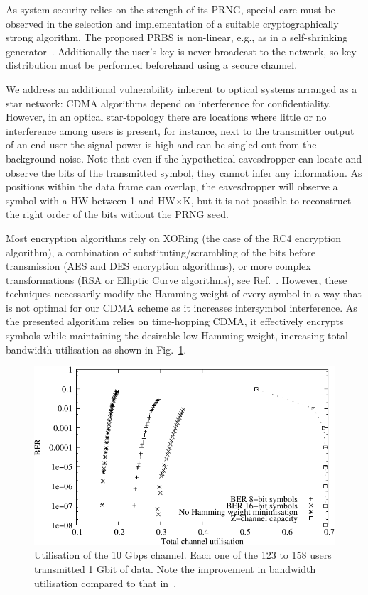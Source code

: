 \documentclass[12pt,twoside,openright]{moddalthesis}
\begin{document}
As system security relies on the strength of its PRNG, special care must be observed in the selection and implementation of a suitable cryptographically strong algorithm.
The proposed PRBS is non-linear, e.g., as in a self-shrinking generator~\cite{Meier:94}.
Additionally the user's key is never broadcast to the network, so key distribution must be performed beforehand using a secure channel.

We address an additional vulnerability inherent to optical systems arranged as a star network: CDMA algorithms depend on interference for confidentiality.
However, in an optical star-topology there are locations where little or no interference among users is present, for instance, next to the transmitter output of an end user the signal power is high and can be singled out from the background noise.
Note that even if the hypothetical eavesdropper can locate and observe the bits of the transmitted symbol, they cannot infer any information.
As positions within the data frame can overlap, the eavesdropper will observe a symbol with a HW between 1 and HW$\times$K, but it is not possible to reconstruct the right order of the bits without the PRNG seed.

Most encryption algorithms rely on XORing (the case of the RC4 encryption algorithm), a combination of substituting/scrambling of the bits before transmission (AES and DES encryption algorithms), or more complex transformations (RSA or Elliptic Curve algorithms), see Ref.~\cite{Menezes:1996:HAC:548089}.
However, these techniques necessarily modify the Hamming weight of every symbol in a way that is not optimal for our CDMA scheme as it increases intersymbol interference.
As the presented algorithm relies on time-hopping CDMA, it effectively encrypts symbols while maintaining the desirable low Hamming weight, increasing total bandwidth utilisation as shown in Fig.~\ref{fig_use}.

\begin{figure}[t]
  \centering
  \includegraphics[width=0.48 \textwidth]{BERvsChannel} 
  \caption{Utilisation of the 10 Gbps channel. Each one of the 123 to 158 users transmitted 1 Gbit of data. Note the improvement in bandwidth utilisation compared to that in~\cite{ortega11}.}
  \label{fig_use}
\end{figure}
\end{document}
